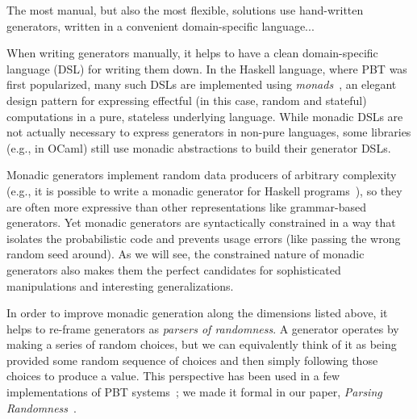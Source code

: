 The most manual, but also the most flexible, solutions use hand-written
generators, written in a convenient domain-specific language...

When writing generators manually, it helps to have a clean domain-specific
language (DSL) for writing them down. In the Haskell language, where PBT was
first popularized, many such DSLs are implemented using {\em
monads\/}~\cite{moggi1991notions}, an elegant design pattern for
expressing effectful (in this case, random and stateful) computations
in a pure, stateless underlying
language. While monadic DSLs are not actually necessary to express generators in
non-pure languages, some libraries (e.g., in OCaml) still use monadic
abstractions to build their generator DSLs.

Monadic generators implement random data producers of arbitrary complexity
(e.g., it is possible to write a monadic generator for Haskell
programs~\cite{palka_testing_2011}), so they are often more expressive than
other representations like grammar-based generators.  Yet monadic generators are
syntactically constrained in a way that isolates the probabilistic code and
prevents usage errors (like passing the wrong random seed around). As we will
see, the constrained nature of monadic generators also makes them the perfect
candidates for sophisticated manipulations and interesting generalizations.

In order to improve monadic generation along the dimensions listed
above, it helps to re-frame generators as {\em parsers of randomness}. A generator
operates by making a series of random choices, but we can equivalently think of
it as being provided some random sequence of choices and then simply following
those choices to produce a value. This perspective has been used in a few
implementations of PBT
systems~\cite{maciver2019hypothesis, dolan2017testing}; we made it
formal in our paper, {\em Parsing Randomness}~\cite{goldstein2022parsing}.

